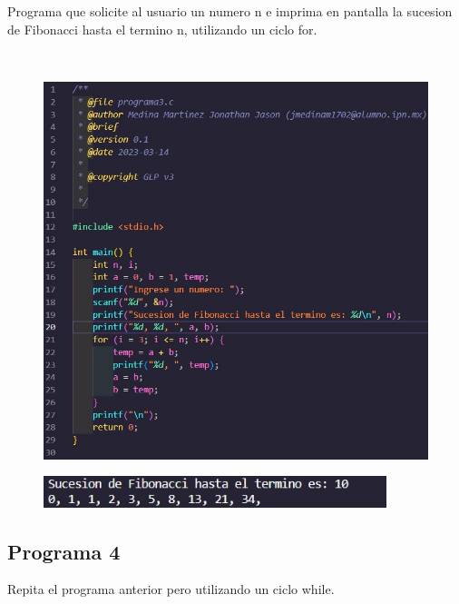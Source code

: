 \documentclass{article}
\begin{document}
Programa que solicite al usuario un numero n e imprima en pantalla la sucesion de Fibonacci hasta el termino n, utilizando un ciclo for.

\

\begin{figure}[H]
    \centering
    \includegraphics[width = 15cm]{img3a.jpg}
\end{figure}
\begin{figure}[H]
    \centering
    \includegraphics[width = 10cm]{img3b.jpg}
\end{figure}
\newpage
\subsection{Programa 4}

Repita el programa anterior pero utilizando un ciclo while.

\
\end{document}
